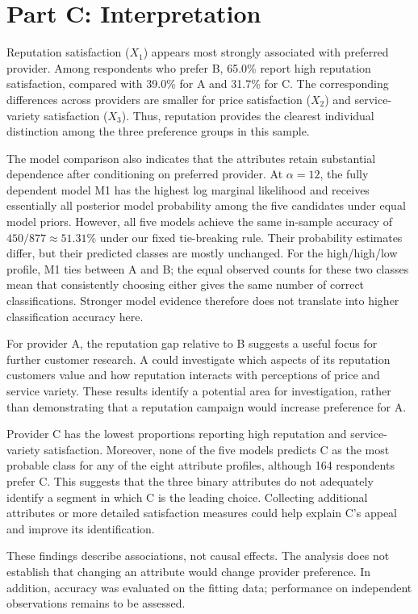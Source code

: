 \documentclass[11pt]{article}
\begin{document}
\section*{Part C: Interpretation}

Reputation satisfaction ($X_1$) appears most strongly associated with
preferred provider. Among respondents who prefer B, 65.0\% report high
reputation satisfaction, compared with 39.0\% for A and 31.7\% for C.
The corresponding differences across providers are smaller for price
satisfaction ($X_2$) and service-variety satisfaction ($X_3$).
Thus, reputation provides the clearest individual distinction among
the three preference groups in this sample.

The model comparison also indicates that the attributes retain substantial
dependence after conditioning on preferred provider. At $\alpha=12$, the
fully dependent model M1 has the highest log marginal likelihood and
receives essentially all posterior model probability among the five
candidates under equal model priors. However, all five models achieve
the same in-sample accuracy of $450/877\approx51.31\%$ under our fixed
tie-breaking rule. Their probability estimates differ, but their predicted
classes are mostly unchanged. For the high/high/low profile, M1 ties
between A and B; the equal observed counts for these two classes mean
that consistently choosing either gives the same number of correct
classifications. Stronger model evidence therefore does not translate
into higher classification accuracy here.

For provider A, the reputation gap relative to B suggests a useful focus
for further customer research. A could investigate which aspects of its
reputation customers value and how reputation interacts with perceptions
of price and service variety. These results identify a potential area
for investigation, rather than demonstrating that a reputation campaign
would increase preference for A.

Provider C has the lowest proportions reporting high reputation and
service-variety satisfaction. Moreover, none of the five models predicts
C as the most probable class for any of the eight attribute profiles,
although 164 respondents prefer C. This suggests that the three binary
attributes do not adequately identify a segment in which C is the leading
choice. Collecting additional attributes or more detailed satisfaction
measures could help explain C's appeal and improve its identification.

These findings describe associations, not causal effects. The analysis
does not establish that changing an attribute would change provider
preference. In addition, accuracy was evaluated on the fitting data;
performance on independent observations remains to be assessed.
\end{document}
